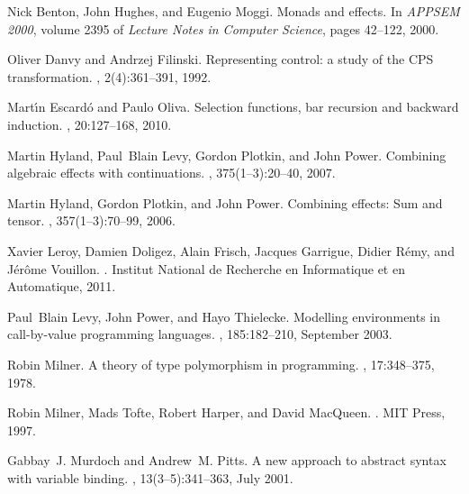 \documentclass[10pt]{article}
\begin{document}
\begin{thebibliography}{10}

Nick Benton, John Hughes, and Eugenio Moggi.
\newblock Monads and effects.
\newblock In {\em APPSEM 2000}, volume 2395 of {\em Lecture Notes in Computer
  Science}, pages 42--122, 2000.

Oliver Danvy and Andrzej Filinski.
\newblock Representing control: a study of the {CPS} transformation.
, 2(4):361--391,
  1992.

Mart{\'\i}n Escard{\'o} and Paulo Oliva.
\newblock Selection functions, bar recursion and backward induction.
, 20:127--168, 2010.

Martin Hyland, Paul~Blain Levy, Gordon Plotkin, and John Power.
\newblock Combining algebraic effects with continuations.
, 375(1--3):20--40, 2007.

Martin Hyland, Gordon Plotkin, and John Power.
\newblock Combining effects: Sum and tensor.
, 357(1--3):70--99, 2006.

Xavier Leroy, Damien Doligez, Alain Frisch, Jacques Garrigue, Didier R\'emy,
  and J\'er\^ome Vouillon.
.
\newblock Institut National de Recherche en Informatique et en Automatique,
  2011.

Paul~Blain Levy, John Power, and Hayo Thielecke.
\newblock Modelling environments in call-by-value programming languages.
, 185:182--210, September 2003.

Robin Milner.
\newblock A theory of type polymorphism in programming.
, 17:348--375, 1978.

Robin Milner, Mads Tofte, Robert Harper, and David MacQueen.
.
\newblock MIT Press, 1997.

Gabbay~J. Murdoch and Andrew~M. Pitts.
\newblock A new approach to abstract syntax with variable binding.
, 13(3--5):341--363, July 2001.


\end{thebibliography}
\end{document}
